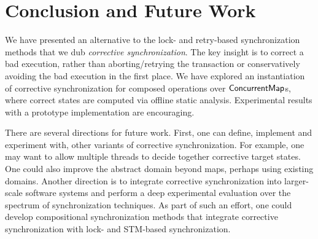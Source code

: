 \section{Conclusion and Future Work}

We have presented an alternative to the lock- and retry-based synchronization methods that we dub \emph{corrective synchronization}. The key insight is to correct a bad execution, rather than aborting/retrying the transaction or conservatively avoiding the bad execution in the first place. We have explored an instantiation of corrective synchronization for composed operations over ${\sf ConcurrentMap}$s, where correct states are computed via offline static analysis.
%
Experimental results with a prototype implementation are encouraging.

There are several directions for future work.
%
First, one can define, implement and experiment with, other variants
of corrective synchronization.  For example, one may want to allow
multiple threads to decide together corrective target states.  One
could also improve the abstract domain beyond maps, perhaps using
existing domains.
%
Another direction is to integrate corrective synchronization into larger-scale
software systems and perform a deep experimental evaluation over the spectrum
of synchronization techniques.
As part of such an effort, one could develop compositional synchronization methods that integrate corrective synchronization with lock- and STM-based synchronization.

